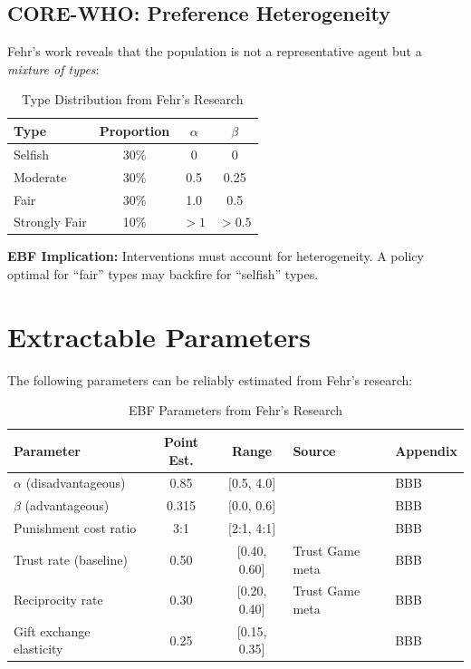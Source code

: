 \subsection{CORE-WHO: Preference Heterogeneity}

Fehr's work reveals that the population is not a representative agent but
a \textit{mixture of types}:

\begin{table}[htbp]
\centering
\caption{Type Distribution from Fehr's Research}
\label{tab:feh-types}
\begin{tabular}{@{}lccc@{}}
\toprule
\textbf{Type} & \textbf{Proportion} & \textbf{$\alpha$} & \textbf{$\beta$} \\
\midrule
Selfish & 30\% & 0 & 0 \\
Moderate & 30\% & 0.5 & 0.25 \\
Fair & 30\% & 1.0 & 0.5 \\
Strongly Fair & 10\% & $>1$ & $>0.5$ \\
\bottomrule
\end{tabular}
\end{table}

\textbf{EBF Implication:} Interventions must account for heterogeneity.
A policy optimal for ``fair'' types may backfire for ``selfish'' types.


\section{Extractable Parameters}
\label{sec:feh-parameters}

The following parameters can be reliably estimated from Fehr's research:

\begin{table}[htbp]
\centering
\caption{EBF Parameters from Fehr's Research}
\label{tab:feh-params}
\renewcommand{\arraystretch}{1.4}
\begin{tabular}{@{}lccll@{}}
\toprule
\textbf{Parameter} & \textbf{Point Est.} & \textbf{Range} & \textbf{Source} & \textbf{Appendix} \\
\midrule
$\alpha$ (disadvantageous) & 0.85 & [0.5, 4.0] & \citet{fehr1999theory} & BBB \\
$\beta$ (advantageous) & 0.315 & [0.0, 0.6] & \citet{fehr1999theory} & BBB \\
Punishment cost ratio & 3:1 & [2:1, 4:1] & \citet{fehr2002strong} & BBB \\
Trust rate (baseline) & 0.50 & [0.40, 0.60] & Trust Game meta & BBB \\
Reciprocity rate & 0.30 & [0.20, 0.40] & Trust Game meta & BBB \\
Gift exchange elasticity & 0.25 & [0.15, 0.35] & \citet{fehr1998reciprocity} & BBB \\
\bottomrule
\end{tabular}
\end{table}

